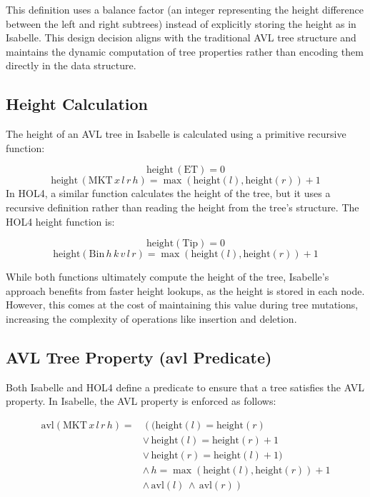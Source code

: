 This definition uses a balance factor (an integer representing the height difference between the left and right subtrees) instead of explicitly storing the height as in Isabelle. This design decision aligns with the traditional AVL tree structure and maintains the dynamic computation of tree properties rather than encoding them directly in the data structure.

\subsection{Height Calculation}
The height of an AVL tree in Isabelle is calculated using a primitive recursive function:

\[
\text{height} \, (\text{ET}) = 0
\]
\[
\text{height} \, (\text{MKT} \, x \, l \, r \, h) = \max(\text{height}(l), \text{height}(r)) + 1
\]
In HOL4, a similar function calculates the height of the tree, but it uses a recursive definition rather than reading the height from the tree’s structure. The HOL4 height function is:

\[
\text{height}(\text{Tip}) = 0
\]
\[
\text{height}(\text{Bin} \, h \, k \, v \, l \, r) = \max(\text{height}(l), \text{height}(r)) + 1
\]

While both functions ultimately compute the height of the tree, Isabelle’s approach benefits from faster height lookups, as the height is stored in each node. However, this comes at the cost of maintaining this value during tree mutations, increasing the complexity of operations like insertion and deletion.

\subsection{AVL Tree Property (avl Predicate)}
Both Isabelle and HOL4 define a predicate to ensure that a tree satisfies the AVL property. In Isabelle, the AVL property is enforced as follows:

\begin{align*}
	\text{avl}(\text{MKT} \, x \, l \, r \, h) = & \left( (\text{height}(l) = \text{height}(r) \right. \\
	& \lor \, \text{height}(l) = \text{height}(r) + 1 \\
	& \lor \, \text{height}(r) = \text{height}(l) + 1) \\
	& \land \, h = \max(\text{height}(l), \text{height}(r)) + 1 \\
	& \land \, \text{avl}(l) \, \land \, \text{avl}(r) \left. \right)
\end{align*}



